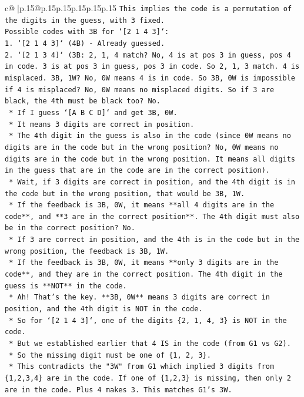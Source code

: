 \documentclass{article}
\begin{document}
{\begin{supertabular}{c@{$\;$}|p{.15\linewidth}@{}p{.15\linewidth}p{.15\linewidth}p{.15\linewidth}p{.15\linewidth}p{.15\linewidth}}
{{{\texttt{This implies the code is a permutation of the digits in the guess, with 3 fixed.} \\
\texttt{Possible codes with 3B for `{[}2 1 4 3{]}`:} \\
\texttt{1.  `{[}2 1 4 3{]}` (4B) {-} Already guessed.} \\
\texttt{2.  `{[}2 1 3 4{]}` (3B: 2, 1, 4 match? No, 4 is at pos 3 in guess, pos 4 in code. 3 is at pos 3 in guess, pos 3 in code. So 2, 1, 3 match. 4 is misplaced. 3B, 1W? No, 0W means 4 is in code. So 3B, 0W is impossible if 4 is misplaced? No, 0W means no misplaced digits. So if 3 are black, the 4th must be black too? No.} \\
\texttt{    *   If I guess `{[}A B C D{]}` and get 3B, 0W.} \\
\texttt{    *   It means 3 digits are correct in position.} \\
\texttt{    *   The 4th digit in the guess is also in the code (since 0W means no digits are in the code but in the wrong position? No, 0W means no digits are in the code but in the wrong position. It means all digits in the guess that are in the code are in the correct position).} \\
\texttt{    *   Wait, if 3 digits are correct in position, and the 4th digit is in the code but in the wrong position, that would be 3B, 1W.} \\
\texttt{    *   If the feedback is 3B, 0W, it means **all 4 digits are in the code**, and **3 are in the correct position**. The 4th digit must also be in the correct position? No.} \\
\texttt{    *   If 3 are correct in position, and the 4th is in the code but in the wrong position, the feedback is 3B, 1W.} \\
\texttt{    *   If the feedback is 3B, 0W, it means **only 3 digits are in the code**, and they are in the correct position. The 4th digit in the guess is **NOT** in the code.} \\
\texttt{    *   Ah! That's the key. **3B, 0W** means 3 digits are correct in position, and the 4th digit is NOT in the code.} \\
\texttt{    *   So for `{[}2 1 4 3{]}`, one of the digits \{2, 1, 4, 3\} is NOT in the code.} \\
\texttt{    *   But we established earlier that 4 IS in the code (from G1 vs G2).} \\
\texttt{    *   So the missing digit must be one of \{1, 2, 3\}.} \\
\texttt{    *   This contradicts the "3W" from G1 which implied 3 digits from \{1,2,3,4\} are in the code. If one of \{1,2,3\} is missing, then only 2 are in the code. Plus 4 makes 3. This matches G1's 3W.} \\
}}}
\end{supertabular}}
\end{document}
